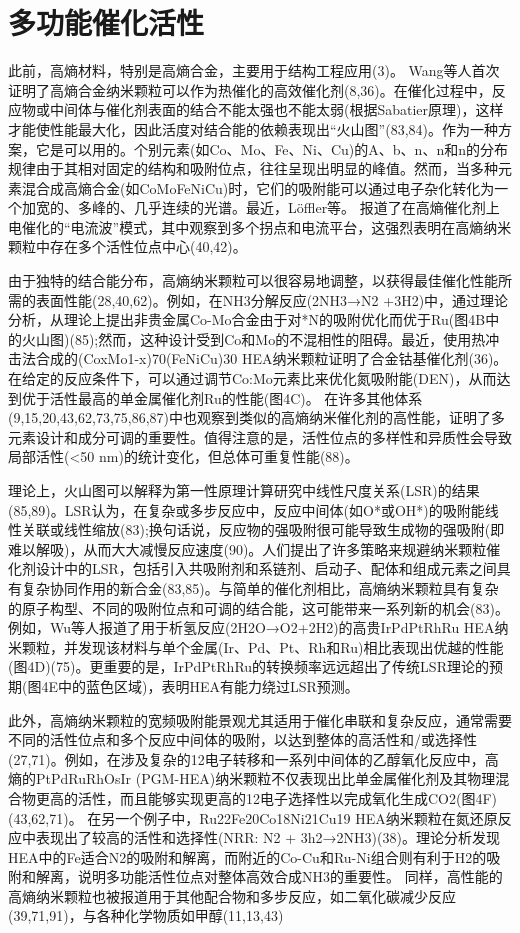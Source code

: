 \documentclass[a4paper]{article}
\begin{document}
\section*{多功能催化活性}
此前，高熵材料，特别是高熵合金，主要用于结构工程应用(3)。
Wang等人首次证明了高熵合金纳米颗粒可以作为热催化的高效催化剂(8,36)。在催化过程中，反应物或中间体与催化剂表面的结合不能太强也不能太弱(根据Sabatier原理)，这样才能使性能最大化，因此活度对结合能的依赖表现出“火山图”(83,84)。作为一种方案，它是可以用的。个别元素(如Co、Mo、Fe、Ni、Cu)的A、b、n、n和n的分布规律由于其相对固定的结构和吸附位点，往往呈现出明显的峰值。然而，当多种元素混合成高熵合金(如CoMoFeNiCu)时，它们的吸附能可以通过电子杂化转化为一个加宽的、多峰的、几乎连续的光谱。最近，Löffler等。
报道了在高熵催化剂上电催化的“电流波”模式，其中观察到多个拐点和电流平台，这强烈表明在高熵纳米颗粒中存在多个活性位点中心(40,42)。



由于独特的结合能分布，高熵纳米颗粒可以很容易地调整，以获得最佳催化性能所需的表面性能(28,40,62)。例如，在NH3分解反应(2NH3→N2 +3H2)中，通过理论分析，从理论上提出非贵金属Co-Mo合金由于对*N的吸附优化而优于Ru(图4B中的火山图)(85);然而，这种设计受到Co和Mo的不混相性的阻碍。最近，使用热冲击法合成的(CoxMo1-x)70(FeNiCu)30 HEA纳米颗粒证明了合金钴基催化剂(36)。
在给定的反应条件下，可以通过调节Co:Mo元素比来优化氮吸附能(DEN)，从而达到优于活性最高的单金属催化剂Ru的性能(图4C)。
在许多其他体系(9,15,20,43,62,73,75,86,87)中也观察到类似的高熵纳米催化剂的高性能，证明了多元素设计和成分可调的重要性。值得注意的是，活性位点的多样性和异质性会导致局部活性(<50 nm)的统计变化，但总体可重复性能(88)。



理论上，火山图可以解释为第一性原理计算研究中线性尺度关系(LSR)的结果(85,89)。LSR认为，在复杂或多步反应中，反应中间体(如O*或OH*)的吸附能线性关联或线性缩放(83);换句话说，反应物的强吸附很可能导致生成物的强吸附(即难以解吸)，从而大大减慢反应速度(90)。人们提出了许多策略来规避纳米颗粒催化剂设计中的LSR，包括引入共吸附剂和系链剂、启动子、配体和组成元素之间具有复杂协同作用的新合金(83,85)。与简单的催化剂相比，高熵纳米颗粒具有复杂的原子构型、不同的吸附位点和可调的结合能，这可能带来一系列新的机会(83)。例如，Wu等人报道了用于析氢反应(2H2O→O2+2H2)的高贵IrPdPtRhRu HEA纳米颗粒，并发现该材料与单个金属(Ir、Pd、Pt、Rh和Ru)相比表现出优越的性能(图4D)(75)。更重要的是，IrPdPtRhRu的转换频率远远超出了传统LSR理论的预期(图4E中的蓝色区域)，表明HEA有能力绕过LSR预测。



此外，高熵纳米颗粒的宽频吸附能景观尤其适用于催化串联和复杂反应，通常需要不同的活性位点和多个反应中间体的吸附，以达到整体的高活性和/或选择性(27,71)。例如，在涉及复杂的12电子转移和一系列中间体的乙醇氧化反应中，高熵的PtPdRuRhOsIr (PGM-HEA)纳米颗粒不仅表现出比单金属催化剂及其物理混合物更高的活性，而且能够实现更高的12电子选择性以完成氧化生成CO2(图4F)(43,62,71)。
在另一个例子中，Ru22Fe20Co18Ni21Cu19 HEA纳米颗粒在氮还原反应中表现出了较高的活性和选择性(NRR: N2 + 3h2→2NH3)(38)。理论分析发现HEA中的Fe适合N2的吸附和解离，而附近的Co-Cu和Ru-Ni组合则有利于H2的吸附和解离，说明多功能活性位点对整体高效合成NH3的重要性。
同样，高性能的高熵纳米颗粒也被报道用于其他配合物和多步反应，如二氧化碳减少反应(39,71,91)，与各种化学物质如甲醇(11,13,43)
\end{document}
